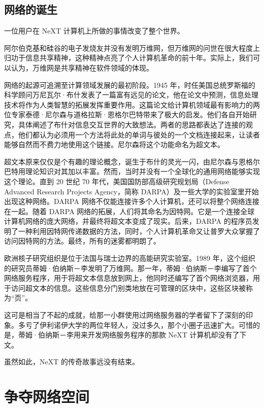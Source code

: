 \documentclass[12pt,UTF8]{ctexbook}
\begin{document}
\subsection{网络的诞生}


一位用户在 NeXT 计算机上所做的事情改变了整个世界。

阿尔伯克基和硅谷的电子发烧友并没有发明万维网，但万维网的问世在很大程度上归功于信息共享精神，这种精神点亮了个人计算机革命的前十年。实际上，我们可以认为，万维网是共享精神在软件领域的体现。

网络的起源可追溯至计算领域发展的最初阶段。1945 年，时任美国总统罗斯福的科学顾问万尼瓦尔·布什发表了一篇富有远见的论文，他在论文中预测，信息处理技术将作为人类智慧的拓展发挥重要作用。这篇论文给计算机领域最有影响力的两位专家泰德·尼尔森与道格拉斯·恩格尔巴特带来了极大的启发。他们各自开始研究，具体阐述了布什对信息交互世界的大致想法。两者的思路都表达了连接的观点，他们都认为必须用一个方法将此处的单词与彼处的一个文档连接起来，让读者能够自然而不费力地使用这个链接。尼尔森将这个功能命名为超文本。

超文本原来仅仅是个有趣的理论概念，诞生于布什的灵光一闪，由尼尔森与恩格尔巴特用理论知识对其加以丰富。然而，当时并没有一个全球化的通用网络能够实现这个理论。直到 20 世纪 70 年代，美国国防部高级研究规划局（Defense Advanced Research Projects Agency，简称 DARPA）及一些大学的实验室里开始出现这种网络。DARPA 网络不仅能连接许多个人计算机，还可以将整个网络连接在一起。随着 DARPA 网络的拓展，人们将其命名为因特网。它是一个连接全球计算机网络的庞大网络，并最终将超文本变成了现实。后来，DARPA 的程序员发明了一种利用因特网传递数据的方法，同时，个人计算机革命又让普罗大众掌握了访问因特网的方法。最终，所有的迷雾都明朗了。

欧洲核子研究组织是位于法国与瑞士边界的高能研究实验室。1989 年，这个组织的研究员蒂姆·伯纳斯－李发明了万维网。那一年，蒂姆·伯纳斯－李编写了首个网络服务程序，用于将超文本信息放到网上，他同时还编写了首个网络浏览器，用于访问超文本的信息。这些信息分门别类地放在可管理的区块中，这些区块被称为“页”。

这可是相当了不起的成就，给那一小群使用过网络服务器的学者留下了深刻的印象。多亏了伊利诺伊大学的两位年轻人，没过多久，那个小圈子迅速扩大。可惜的是，蒂姆·伯纳斯－李用来开发网络服务程序的那款 NeXT 计算机却没有了下文。

虽然如此，NeXT 的传奇故事远没有结束。





\section{争夺网络空间}
\end{document}
